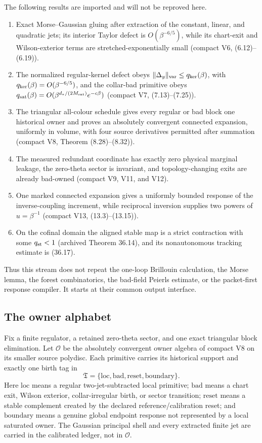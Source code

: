 \documentclass[11pt]{article}
\theoremstyle{definition}
\theoremstyle{remark}
\begin{document}
The following results are imported and will not be reproved here.
\begin{enumerate}[label=\textup{(I\arabic*)},leftmargin=4em]
\item Exact Morse--Gaussian gluing after extraction of the constant, linear,
and quadratic jets; its interior Taylor defect is
$O(\beta^{-6/5})$, while its chart-exit and Wilson-exterior terms are
stretched-exponentially small (compact V6, (6.12)--(6.19)).
\item The normalized regular-kernel defect obeys
$\|\Delta_y\|_{\rm var}\le q_{\rm ker}(\beta)$, with
$q_{\rm ker}(\beta)=O(\beta^{-6/5})$, and the collar-bad primitive obeys
$q_{\rm sat}(\beta)=O(\beta^{d_*/(2M_{\rm sat})}e^{-c\beta})$
(compact V7, (7.13)--(7.25)).
\item The triangular all-colour schedule gives every regular or bad block one
historical owner and proves an absolutely convergent connected expansion,
uniformly in volume, with four source derivatives permitted after summation
(compact V8, Theorem (8.28)--(8.32)).
\item The measured redundant coordinate has exactly zero physical marginal
leakage, the zero-theta sector is invariant, and topology-changing exits are
already bad-owned (compact V9, V11, and V12).
\item One marked connected expansion gives a uniformly bounded response of the
inverse-coupling increment, while reciprocal inversion supplies two powers of
$u=\beta^{-1}$ (compact V13, (13.3)--(13.15)).
\item On the cofinal domain the aligned stable map is a strict contraction
with some $q_{\rm st}<1$ (archived Theorem 36.14), and its nonautonomous
tracking estimate is (36.17).
\end{enumerate}

Thus this stream does not repeat the one-loop Brillouin calculation, the Morse
lemma, the forest combinatorics, the bad-field Peierls estimate, or the
packet-first response compiler.  It starts at their common output interface.

\subsection{The owner alphabet}

Fix a finite regulator, a retained zero-theta sector, and one exact triangular
block elimination.  Let $\mathcal O$ be the absolutely convergent owner algebra
of compact V8 on its smaller source polydisc.  Each primitive carries its
historical support and exactly one birth tag in
\[
 \mathfrak T=\{\mathrm{loc},\mathrm{bad},\mathrm{reset},
                 \mathrm{boundary}\}.                       \tag{1.1}
\]
Here $\mathrm{loc}$ means a regular two-jet-subtracted local primitive;
$\mathrm{bad}$ means a chart exit, Wilson exterior, collar-irregular birth, or
sector transition; $\mathrm{reset}$ means a stable complement created by the
declared reference/calibration reset; and $\mathrm{boundary}$ means a genuine
global endpoint response not represented by a local saturated owner.  The
Gaussian principal shell and every extracted finite jet are carried in the
calibrated ledger, not in $\mathcal O$.
\end{document}
